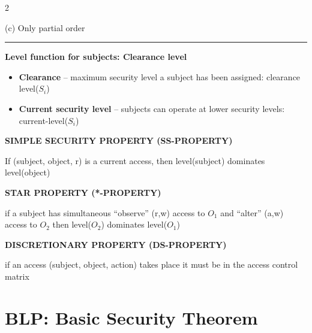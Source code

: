 \documentclass[a4paper,9pt]{extarticle}
\newcommand{\separator}{
\vspace{2pt}
\hrule
\vspace{3pt}
}
\begin{document}
\begin{multicols}{2}
\begin{important}
(c) Only partial order

\end{important}


\separator


\textbf{Level function for subjects: Clearance level}

\begin{itemize}

\item \textbf{Clearance} -- maximum security level a subject has been assigned: clearance level($S_i$)

\item \textbf{Current security level} -- subjects can operate at lower security levels: current-level($S_i$)

\end{itemize}


\begin{definition}

\textbf{SIMPLE SECURITY PROPERTY (SS-PROPERTY)}

If (subject, object, r) is a current access, then level(subject) dominates level(object)

\end{definition}


\begin{definition}

\textbf{STAR PROPERTY (*-PROPERTY)}

if a subject has simultaneous ``observe'' (r,w) access to $O_1$
and ``alter'' (a,w) access to $O_2$
then level($O_2$) dominates level($O_1$)

\end{definition}


\begin{definition}

\textbf{DISCRETIONARY PROPERTY (DS-PROPERTY)}

if an access (subject, object, action) takes place it must be in the access
control matrix

\end{definition}



\section{BLP: Basic Security Theorem}


\begin{important}


\end{important}
\end{multicols}
\end{document}
